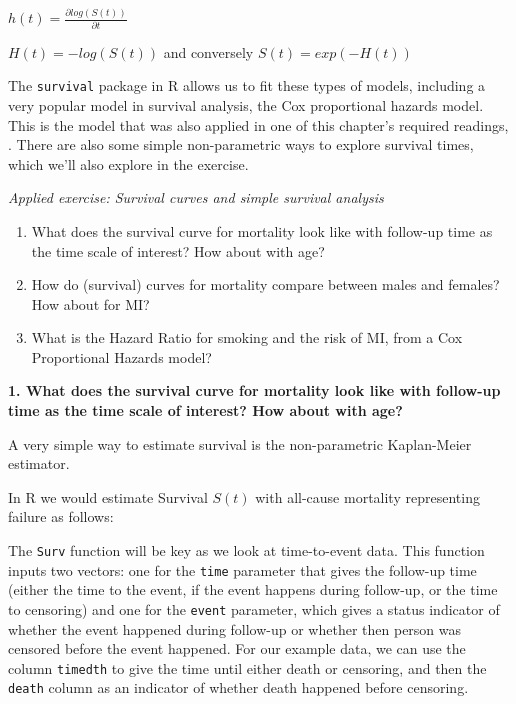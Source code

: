 \documentclass[
]{book}
\newenvironment{Shaded}{\begin{snugshade}}{\end{snugshade}}
\newcommand{\AttributeTok}[1]{\textcolor[rgb]{0.13,0.29,0.53}{#1}}
\newcommand{\FunctionTok}[1]{\textcolor[rgb]{0.13,0.29,0.53}{\textbf{#1}}}
\newcommand{\NormalTok}[1]{#1}
\newcommand{\OtherTok}[1]{\textcolor[rgb]{0.56,0.35,0.01}{#1}}
\newcommand{\SpecialCharTok}[1]{\textcolor[rgb]{0.81,0.36,0.00}{\textbf{#1}}}
\providecommand{\tightlist}{%
  \setlength{\itemsep}{0pt}\setlength{\parskip}{0pt}}
\begin{document}
\(h(t)=\frac{\partial log(S(t))}{\partial t}\)

\(H(t)=-log(S(t))\) and conversely \(S(t)=exp(-H(t))\)

The \texttt{survival} package in R allows us to fit these types of models, including a very popular model in survival analysis, the Cox proportional hazards model. This is the model that was also applied in one of this chapter's required readings, \citet{wong1989risk}. There are also some simple non-parametric ways to explore survival times, which we'll also explore in the exercise.

\emph{Applied exercise: Survival curves and simple survival analysis}

\begin{enumerate}
\def\labelenumi{\arabic{enumi}.}
\tightlist
\item
  What does the survival curve for mortality look like with follow-up time as the time scale of interest? How about with age?
\item
  How do (survival) curves for mortality compare between males and females? How about for MI?
\item
  What is the Hazard Ratio for smoking and the risk of MI, from a Cox Proportional Hazards model?
\end{enumerate}

\textbf{1. What does the survival curve for mortality look like with follow-up time as the time scale of interest? How about with age?}

A very simple way to estimate survival is the non-parametric Kaplan-Meier estimator.

In R we would estimate Survival \(S(t)\) with all-cause mortality representing failure as follows:

\begin{Shaded}
\end{Shaded}

The \texttt{Surv} function will be key as we look at time-to-event data. This function inputs two vectors: one for the \texttt{time} parameter that gives the follow-up time (either the time to the event, if the event happens during follow-up, or the time to censoring) and one for the \texttt{event} parameter, which gives a status indicator of whether the event happened during follow-up or whether then person was censored before the event happened. For our example data, we can use the column \texttt{timedth} to give the time until either death or censoring, and then the \texttt{death} column as an indicator of whether death happened before censoring.
\end{document}
